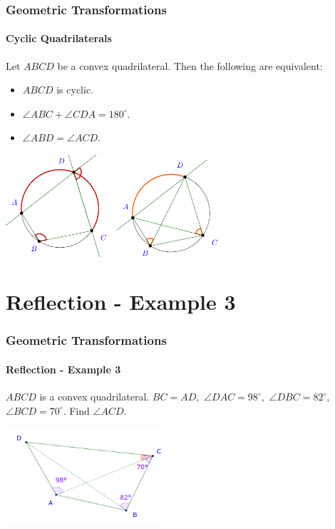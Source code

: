 \documentclass[8pt,xcolor=table,dvipsnames]{beamer}
\newcommand{\dg}{^\circ}
\begin{document}
\begin{frame}[t]
    \frametitle{Geometric Transformations}
    \framesubtitle{Cyclic Quadrilaterals}
    \begin{theorem}
        Let $ABCD$ be a convex quadrilateral. Then the following are equivalent:
        \begin{itemize}
            \item $ABCD$ is cyclic.
            \item $\angle ABC + \angle CDA = 180\dg$.
            \item $\angle ABD=\angle ACD$.
        \end{itemize}
    \end{theorem}
    \begin{center}
        \includegraphics[width=4cm]{./asy/pdf/cyclic-quadrilaterals-1.pdf}
        \quad
        \includegraphics[width=4cm]{./asy/pdf/cyclic-quadrilaterals-2.pdf}
    \end{center}
\end{frame}

\section{Reflection - Example 3}

\begin{frame}[t]
    \frametitle{Geometric Transformations}
    \framesubtitle{Reflection - Example 3}
    \begin{example}
        $ABCD$ is a convex quadrilateral. $BC = AD,$ $\angle DAC = 98^\circ,$ $\angle DBC = 82^\circ,$ $\angle BCD = 70^\circ.$
        Find $\angle ACD.$    
    \end{example}

    \bigbreak
    \begin{center}
        \includegraphics[width=6cm]{./svg/pdf/pct-2021-3-4-3-2-0.pdf}
    \end{center}
\end{frame}
\end{document}
